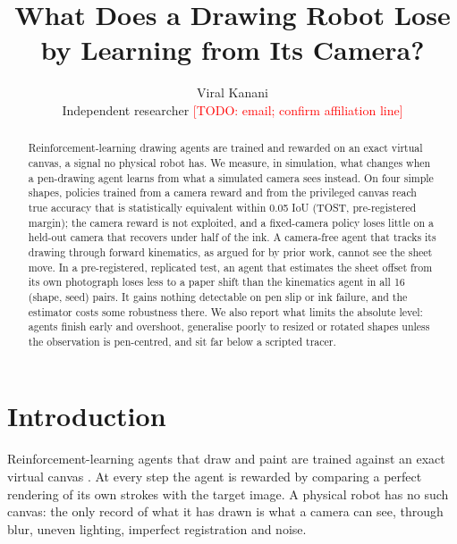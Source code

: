 \documentclass[conference]{IEEEtran}
\newcommand{\TODO}[1]{\textcolor{red}{[TODO: #1]}}
\begin{document}
\title{What Does a Drawing Robot Lose by Learning from Its Camera?}
\author{Viral Kanani\\Independent researcher \TODO{email; confirm affiliation line}}
\maketitle

\begin{abstract}
Reinforcement-learning drawing agents are trained and rewarded on an exact virtual canvas,
a signal no physical robot has. We measure, in simulation, what changes when a pen-drawing
agent learns from what a simulated camera sees instead. On four simple shapes, policies
trained from a camera reward and from the privileged canvas reach true accuracy that is
statistically equivalent within 0.05 IoU (TOST, pre-registered margin); %
the camera reward is not exploited, and a fixed-camera policy loses little on a held-out
camera that recovers under half of the ink. A camera-free agent that tracks its drawing
through forward kinematics, as argued for by prior work, cannot see the sheet move. In a
pre-registered, replicated test, an agent that estimates the sheet offset from its own
photograph loses less to a paper shift than the kinematics agent in all 16 (shape, seed)
pairs. %
It gains nothing detectable on pen slip or ink failure, and the estimator costs some
robustness there. We also report what limits the absolute level: agents finish early and
overshoot, generalise poorly to resized or rotated shapes unless the observation is
pen-centred, and sit far below a scripted tracer.
\end{abstract}

\section{Introduction}
Reinforcement-learning agents that draw and paint are trained against an exact virtual
canvas \cite{D02,D05,D06,D07,D01}. At every step the agent is rewarded by comparing a
perfect rendering of its own strokes with the target image. A physical robot has no such
canvas: the only record of what it has drawn is what a camera can see, through blur,
uneven lighting, imperfect registration and noise.
\end{document}
